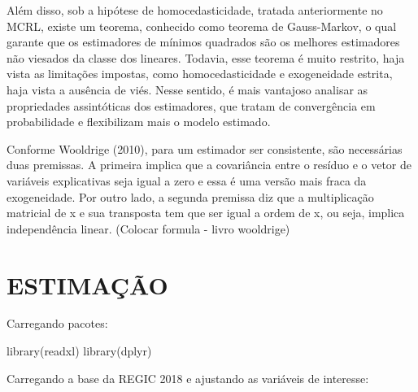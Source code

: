 \documentclass[a4paper,12pt]{article}
\newenvironment{Shaded}{}{}
\newcommand{\FunctionTok}[1]{\textcolor[rgb]{0.25,0.47,0.95}{#1}}
\newcommand{\NormalTok}[1]{\textcolor[rgb]{0.22,0.23,0.26}{#1}}
\begin{document}
Além disso, sob a hipótese de homocedasticidade, tratada anteriormente
no MCRL, existe um teorema, conhecido como teorema de Gauss-Markov, o
qual garante que os estimadores de mínimos quadrados são os melhores
estimadores não viesados da classe dos lineares. Todavia, esse teorema é
muito restrito, haja vista as limitações impostas, como
homocedasticidade e exogeneidade estrita, haja vista a ausência de viés.
Nesse sentido, é mais vantajoso analisar as propriedades assintóticas
dos estimadores, que tratam de convergência em probabilidade e
flexibilizam mais o modelo estimado.

Conforme Wooldrige (2010), para um estimador ser consistente, são
necessárias duas premissas. A primeira implica que a covariância entre o
resíduo e o vetor de variáveis explicativas seja igual a zero e essa é
uma versão mais fraca da exogeneidade. Por outro lado, a segunda
premissa diz que a multiplicação matricial de x e sua transposta tem que
ser igual a ordem de x, ou seja, implica independência linear. (Colocar
formula - livro wooldrige)

\hypertarget{estimauxe7uxe3o}{%
\section{ESTIMAÇÃO}\label{estimauxe7uxe3o}}

Carregando pacotes:

\begin{Shaded}
\begin{Highlighting}[]
\FunctionTok{library}\NormalTok{(readxl)}
\FunctionTok{library}\NormalTok{(dplyr)}
\end{Highlighting}
\end{Shaded}

Carregando a base da REGIC 2018 e ajustando as variáveis de interesse:
\end{document}
